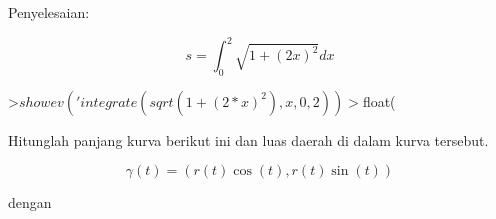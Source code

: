 \documentclass[a4paper,10pt]{article}
\begin{document}
\begin{eulernotebook}
\begin{eulercomment}
\begin{eulercomment}
\begin{eulercomment}
\begin{eulercomment}
\begin{eulercomment}
\begin{eulercomment}
\begin{eulercomment}
\begin{eulercomment}
\begin{eulercomment}
\begin{eulercomment}
\begin{eulercomment}
\begin{eulercomment}
\begin{eulercomment}
\begin{eulercomment}
\begin{eulercomment}
\begin{eulercomment}
\begin{eulercomment}
\begin{eulercomment}
\begin{eulercomment}
\begin{eulercomment}
\begin{eulercomment}
\begin{eulercomment}
\begin{eulercomment}
\begin{eulercomment}
\begin{eulercomment}
Penyelesaian:\\
\end{eulercomment}
\begin{eulerformula}
\[
s = \int_0^2 \sqrt{1 + (2x)^2} dx
\]
\end{eulerformula}
\begin{eulerprompt}
>$showev('integrate(sqrt(1 + (2*x)^2),x,0,2))
>$float(%
\end{eulerprompt}
\begin{eulercomment}
Hitunglah panjang kurva berikut ini dan luas daerah di dalam kurva
tersebut.

\end{eulercomment}
\begin{eulerformula}
\[
\gamma(t) = (r(t) \cos(t), r(t) \sin(t))
\]
\end{eulerformula}
\begin{eulercomment}
dengan


\end{eulercomment}
\end{eulercomment}
\end{eulercomment}
\end{eulercomment}
\end{eulercomment}
\end{eulercomment}
\end{eulercomment}
\end{eulercomment}
\end{eulercomment}
\end{eulercomment}
\end{eulercomment}
\end{eulercomment}
\end{eulercomment}
\end{eulercomment}
\end{eulercomment}
\end{eulercomment}
\end{eulercomment}
\end{eulercomment}
\end{eulercomment}
\end{eulercomment}
\end{eulercomment}
\end{eulercomment}
\end{eulercomment}
\end{eulercomment}
\end{eulercomment}
\end{eulernotebook}
\end{document}
